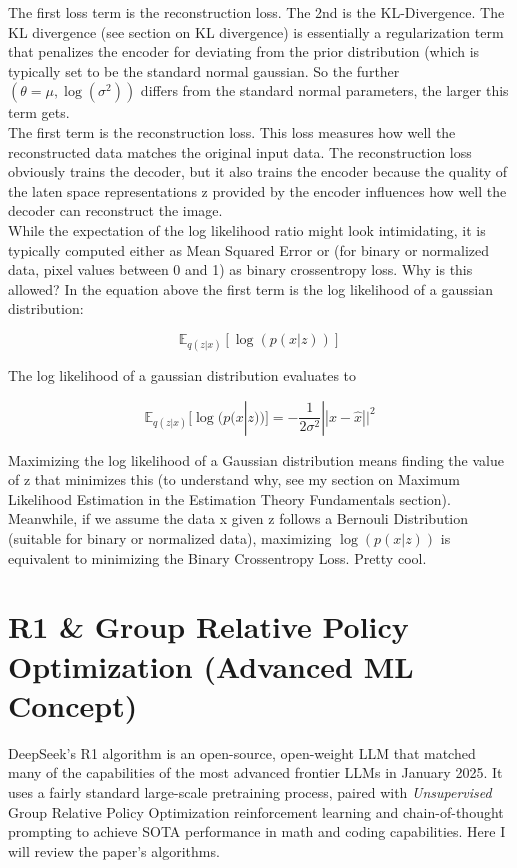 \documentclass[12pt]{article}
\begin{document}
The first loss term is the reconstruction loss. The 2nd is the KL-Divergence. The KL divergence (see section on KL divergence) is essentially a regularization term that penalizes the encoder for deviating from the prior distribution (which is typically set to be the standard normal gaussian. So the further \((\theta = \mu, \log(\sigma^2))\) differs from the standard normal parameters, the larger this term gets.\\

The first term is the reconstruction loss. This loss measures how well the reconstructed data matches the original input data. The reconstruction loss obviously trains the decoder, but it also trains the encoder because the quality of the laten space representations z provided by the encoder influences how well the decoder can reconstruct the image. \\

While the expectation of the log likelihood ratio might look intimidating, it is typically computed either as Mean Squared Error or (for binary or normalized data, pixel values between 0 and 1) as binary crossentropy loss. Why is this allowed? In the equation above the first term is the log likelihood of a gaussian distribution:

\[ \mathbb{E}_{q(z|x)}[\log(p(x|z))] \]

The log likelihood of a gaussian distribution evaluates to 

\[ \mathbb{E}_{q(z|x)}[\log(p(x|z))] = -\frac{1}{2\sigma^2}|| x - \hat{x}||^2\]

Maximizing the log likelihood of a Gaussian distribution means finding the value of z that minimizes this (to understand why, see my section on Maximum Likelihood Estimation in the Estimation Theory Fundamentals section). \\

Meanwhile, if we assume the data x given z follows a Bernouli Distribution (suitable for binary or normalized data), maximizing \(\log(p(x|z))\) is equivalent to minimizing the Binary Crossentropy Loss. Pretty cool.
\section{R1 \& Group Relative Policy Optimization (Advanced ML Concept)}
DeepSeek's R1 algorithm is an open-source, open-weight LLM that matched many of the capabilities of the most advanced frontier LLMs in January 2025. It uses a fairly standard large-scale pretraining process, paired with \emph{Unsupervised} Group Relative Policy Optimization reinforcement learning and chain-of-thought prompting to achieve SOTA performance in math and coding capabilities. Here I will review the paper's algorithms. \\
\end{document}
